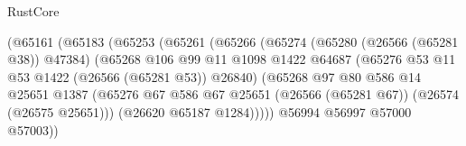 \begin{lexlean}{RustCore}
\begin{coremodule}
                                            (@65161
                                              (@65183
                                                (@65253
                                                  (@65261
                                                    (@65266
                                                      (@65274
                                                        (@65280 (@26566 (@65281 @38)) @47384)
                                                        (@65268
                                                          @106
                                                          @99
                                                          @11
                                                          @1098
                                                          @1422
                                                          @64687
                                                          (@65276
                                                            @53
                                                            @11
                                                            @53
                                                            @1422
                                                            (@26566 (@65281 @53))
                                                            @26840)
                                                          (@65268
                                                            @97
                                                            @80
                                                            @586
                                                            @14
                                                            @25651
                                                            @1387
                                                            (@65276
                                                              @67
                                                              @586
                                                              @67
                                                              @25651
                                                              (@26566 (@65281 @67))
                                                              (@26574 (@26575 @25651)))
                                                            (@26620 @65187 @1284)))))
                                                    @56994
                                                    @56997
                                                    @57000
                                                    @57003))

\end{coremodule}
\end{lexlean}
